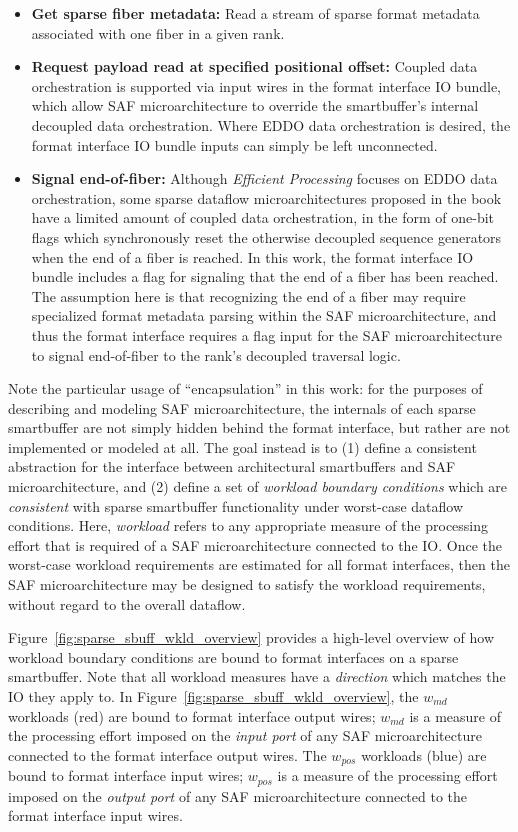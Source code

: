 \begin{itemize}
    \item \textbf{Get sparse fiber metadata:} Read a stream of sparse format metadata associated with one fiber in a given rank.
    \item \textbf{Request payload read at specified positional offset:} Coupled data orchestration is supported via input wires in the format interface IO bundle, which allow SAF microarchitecture to override the smartbuffer's internal decoupled data orchestration. Where EDDO data orchestration is desired, the format interface IO bundle inputs can simply be left unconnected.
    \item \textbf{Signal end-of-fiber:} Although \textit{Efficient Processing}\cite{szebook} focuses on EDDO data orchestration, some sparse dataflow microarchitectures proposed in the book have a limited amount of coupled data orchestration, in the form of one-bit flags which synchronously reset the otherwise decoupled sequence generators when the end of a fiber is reached. In this work, the format interface IO bundle includes a flag for signaling that the end of a fiber has been reached. The assumption here is that recognizing the end of a fiber may require specialized format metadata parsing within the SAF microarchitecture, and thus the format interface requires a flag input for the SAF microarchitecture to signal end-of-fiber to the rank's decoupled traversal logic.
\end{itemize}

Note the particular usage of ``encapsulation'' in this work: for the purposes of describing and modeling SAF microarchitecture, the internals of each sparse smartbuffer are not simply hidden behind the format interface, but rather are not implemented or modeled at all. The goal instead is to (1) define a consistent abstraction for the interface between architectural smartbuffers and SAF microarchitecture, and (2) define a set of \textit{workload boundary conditions} which are \textit{consistent} with sparse smartbuffer functionality under worst-case dataflow conditions. Here, \textit{workload} refers to any appropriate measure of the processing effort that is required of a SAF microarchitecture connected to the IO. Once the worst-case workload requirements are estimated for all format interfaces, then the SAF microarchitecture may be designed to satisfy the workload requirements, without regard to the overall dataflow. 

Figure~\ref{fig:sparse_sbuff_wkld_overview} provides a high-level overview of how workload boundary conditions are bound to format interfaces on a sparse smartbuffer. Note that all workload measures have a \textit{direction} which matches the IO they apply to. In Figure~\ref{fig:sparse_sbuff_wkld_overview}, the $w_{md}$ workloads (red) are bound to format interface output wires; $w_{md}$ is a measure of the processing effort imposed on the \textit{input port} of any SAF microarchitecture connected to the format interface output wires. The $w_{pos}$ workloads (blue) are bound to format interface input wires; $w_{pos}$ is a measure of the processing effort imposed on the \textit{output port} of any SAF microarchitecture connected to the format interface input wires.

